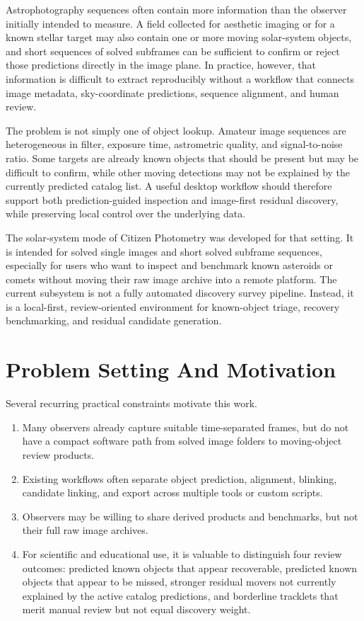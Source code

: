 \documentclass[modern]{aastex701}
\begin{document}
Astrophotography sequences often contain more information than the observer initially intended to measure. A field collected for aesthetic imaging or for a known stellar target may also contain one or more moving solar-system objects, and short sequences of solved subframes can be sufficient to confirm or reject those predictions directly in the image plane. In practice, however, that information is difficult to extract reproducibly without a workflow that connects image metadata, sky-coordinate predictions, sequence alignment, and human review.

The problem is not simply one of object lookup. Amateur image sequences are heterogeneous in filter, exposure time, astrometric quality, and signal-to-noise ratio. Some targets are already known objects that should be present but may be difficult to confirm, while other moving detections may not be explained by the currently predicted catalog list. A useful desktop workflow should therefore support both prediction-guided inspection and image-first residual discovery, while preserving local control over the underlying data.

The solar-system mode of Citizen Photometry was developed for that setting. It is intended for solved single images and short solved subframe sequences, especially for users who want to inspect and benchmark known asteroids or comets without moving their raw image archive into a remote platform. The current subsystem is not a fully automated discovery survey pipeline. Instead, it is a local-first, review-oriented environment for known-object triage, recovery benchmarking, and residual candidate generation.

\section{Problem Setting And Motivation}\label{sec:motivation}

Several recurring practical constraints motivate this work.

\begin{enumerate}
\item Many observers already capture suitable time-separated frames, but do not have a compact software path from solved image folders to moving-object review products.
\item Existing workflows often separate object prediction, alignment, blinking, candidate linking, and export across multiple tools or custom scripts.
\item Observers may be willing to share derived products and benchmarks, but not their full raw image archives.
\item For scientific and educational use, it is valuable to distinguish four review outcomes: predicted known objects that appear recoverable, predicted known objects that appear to be missed, stronger residual movers not currently explained by the active catalog predictions, and borderline tracklets that merit manual review but not equal discovery weight.
\end{enumerate}
\end{document}
